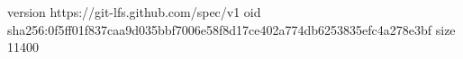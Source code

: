 version https://git-lfs.github.com/spec/v1
oid sha256:0f5ff01f837caa9d035bbf7006e58f8d17ce402a774db6253835efc4a278e3bf
size 11400
